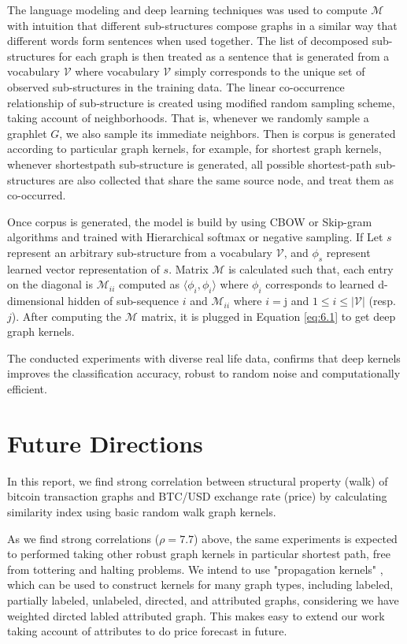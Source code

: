 \documentclass[12pt,a4paper]{article}
\numberwithin{equation}{section}
\numberwithin{figure}{section}
\numberwithin{table}{section}
\begin{document}
The language modeling and deep learning techniques was used to compute $\mathcal{M}$ with intuition that different
sub-structures compose graphs in a similar way that different words form sentences when used together. The list of decomposed sub-structures
for each graph is then treated as a sentence that is generated from a
vocabulary $\mathcal{V}$  where vocabulary $\mathcal{V}$ simply corresponds to the unique set of observed sub-structures in the training data. The linear co-occurrence relationship of sub-structure is created using modified random sampling scheme, taking account of neighborhoods. That is, whenever we randomly sample a graphlet $G$, we also sample its immediate neighbors. Then is corpus is generated according to particular graph kernels, for example, for shortest graph kernels, whenever shortestpath sub-structure is generated, all possible shortest-path
sub-structures are also collected that share the same source node, and treat them
as co-occurred.

Once corpus is generated, the model is build by using CBOW or Skip-gram algorithms and trained with Hierarchical softmax or negative sampling. If Let $s$ represent an arbitrary sub-structure from a vocabulary $\mathcal{V}$, and $\phi_{s}$ represent learned vector representation of $s$. Matrix $\mathcal{M}$ is calculated such that, each entry on the diagonal is $\mathcal{M}_{ii}$ computed as $\big \langle \phi_{i},\phi_{i} \big \rangle$ where $\phi_{i}$ corresponds
to learned d-dimensional hidden of sub-sequence $i$ and $\mathcal{M}_{ii}$
where $i = $j and $1 \leq i \leq |\mathcal{V}|$ (resp. $j$). After computing the $\mathcal{M}$ matrix, it is plugged in Equation \ref{eq:6.1} to get deep graph kernels.

The conducted experiments with diverse real life data, confirms that deep kernels improves the classification accuracy, robust to random noise and computationally efficient.

\section{Future Directions}
\label{sec:con}

In this report, we find strong correlation between structural property (walk) of bitcoin transaction graphs and BTC/USD exchange rate (price) by calculating similarity index using basic random walk graph kernels\citep{Gartner2003, Kashima2003}. 

As we find strong correlations ($\rho =7.7$) above, the same experiments is expected to performed taking other robust graph kernels in particular shortest path, free from tottering and halting problems. We intend to use "propagation kernels" \citep{Neumann2015}, which can be used to construct kernels for many graph types, including labeled, partially labeled, unlabeled, directed, and attributed graphs, considering we have weighted dircted labled attributed graph. This makes easy to extend our work taking account of attributes to do price forecast in future. 
\end{document}

